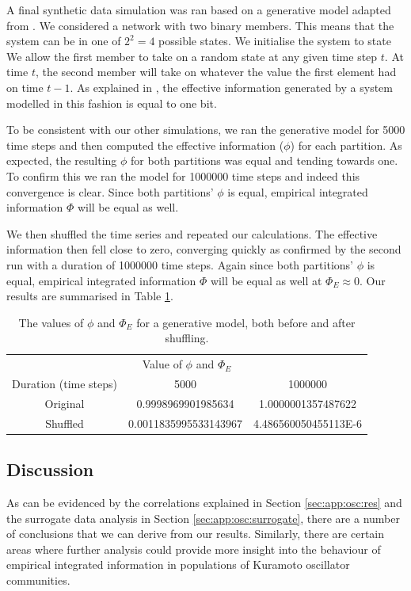 \documentclass[a4paper,11pt]{article}
\begin{document}
A final synthetic data simulation was ran based on a generative model adapted from \cite{WikimediaFoundation2015}. We considered a network with two binary members. This means that the system can be in one of $2^2 = 4$ possible states. We initialise the system to state We allow the first member to take on a random state at any given time step $t$. At time $t$, the second member will take on whatever the value the first element had on time $t-1$. As explained in \cite{WikimediaFoundation2015}, the effective information generated by a system modelled in this fashion is equal to one bit.

To be consistent with our other simulations, we ran the generative model for 5000 time steps and then computed the effective information ($\phi$) for each partition. As expected, the resulting $\phi$ for both partitions was equal and tending towards one. To confirm this we ran the model for 1000000 time steps and indeed this convergence is clear. Since both partitions' $\phi$ is equal, empirical integrated information $\Phi$ will be equal as well.

We then shuffled the time series and repeated our calculations. The effective information then fell close to zero, converging quickly as confirmed by the second run with a duration of 1000000 time steps. Again since both partitions' $\phi$ is equal, empirical integrated information $\Phi$ will be equal as well at $\Phi_E \approx 0$. Our results are summarised in Table \ref{tab:synth-generative}.

\begin{table}[H]
\centering
\begin{tabular}{ c | c c }
\multicolumn{3}{c}{Value of $\phi$ and $\Phi_E$} \\ [2mm]
Duration (time steps) & 5000 & 1000000\\
\hline
Original & 0.9998969901985634 & 1.0000001357487622 \\
Shuffled & 0.0011835995533143967 & 4.486560050455113E-6\\
\end{tabular}
\caption{
	The values of $\phi$ and $\Phi_E$ for a generative model, both before and after shuffling.
	\label{tab:synth-generative}
}
\end{table}

\subsection{Discussion}

As can be evidenced by the correlations explained in Section \ref{sec:app:osc:res} and the surrogate data analysis in Section \ref{sec:app:osc:surrogate}, there are a number of conclusions that we can derive from our results. Similarly, there are certain areas where further analysis could provide more insight into the behaviour of empirical integrated information in populations of Kuramoto oscillator communities.
\end{document}
